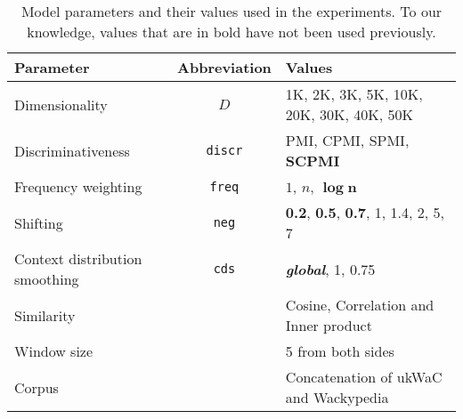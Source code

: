 \begin{table}
  \centering
  \small
  \begin{tabular}{lcl}
    \toprule
    Parameter           & Abbreviation   & Values \\
    \midrule
    Dimensionality      & $D$            & 1K, 2K, 3K, 5K, 10K, 20K, 30K, 40K, 50K \\
    Discriminativeness  & \texttt{discr} & PMI, CPMI, SPMI, \textbf{SCPMI} \\
    Frequency weighting & \texttt{freq}  & $1$, $n$, $\boldsymbol{\log n}$ \\
    Shifting            & \texttt{neg}   & \textbf{0.2}, \textbf{0.5}, \textbf{0.7}, 1, 1.4, 2, 5, 7 \\
    Context distribution smoothing       & \texttt{cds} & \textbf{\textit{global}}, 1, 0.75 \\
    Similarity          &                & Cosine, Correlation and Inner product \\
    \addlinespace
    Window size         &                & 5 from both sides                     \\
    Corpus              &                & Concatenation of ukWaC and Wackypedia \\
    \bottomrule
  \end{tabular}
  \caption{Model parameters and their values used in the experiments. To our
    knowledge, values that are in bold have not been used previously.}
\label{tab:parameters}
\end{table}

